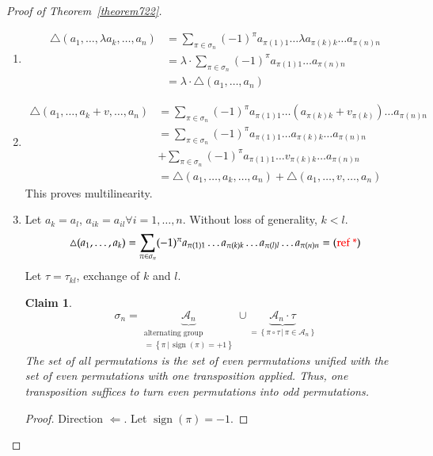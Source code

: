 \documentclass{article}
\numberwithin{lecref}{section}
\newtheorem*{claim}{Claim}
\newcommand{\setdef}[2]{\left\{\left.#1\,\right|\,#2\right\}}
\DeclareMathOperator{\sign}{sign}
\begin{document}
\begin{proof}[Proof of Theorem~\ref{theorem722}]
  \begin{enumerate}
    \item
      \begin{align*}
        \triangle(a_1, \dots, \lambda a_k, \dots, a_n)
          &= \sum_{\pi \in \sigma_n} (-1)^{\pi} a_{\pi(1)1} \dots \lambda a_{\pi(k) k} \dots a_{\pi(n) n} \\
          &= \lambda \cdot \sum_{\pi \in \sigma_n} (-1)^\pi a_{\pi(1) 1} \dots a_{\pi(n) n} \\
          &= \lambda \cdot \triangle(a_1, \dots, a_n)
      \end{align*}
    \item
      \begin{align*}
        \triangle(a_1, \dots, a_k + v, \dots, a_n)
          &= \sum_{\pi \in \sigma_n} (-1)^\pi a_{\pi(1) 1} \dots (a_{\pi(k) k} + v_{\pi(k)}) \dots a_{\pi(n) n} \\
          &= \sum_{\pi \in \sigma_n} (-1)^\pi a_{\pi(1) 1} \dots a_{\pi(k) k} \dots a_{\pi(n) n} \\
          &+ \sum_{\pi \in \sigma_n} (-1)^\pi a_{\pi(1) 1} \dots v_{\pi(k) k} \dots a_{\pi(n) n} \\
          &= \triangle(a_1, \dots, a_k, \dots, a_n) + \triangle(a_1, \dots, v, \dots, a_n)
      \end{align*}
      This proves multilinearity.
    \item
      Let $a_k = a_l$, $a_{ik} = a_{il} \forall i = 1, \dots, n$.
      Without loss of generality, $k < l$.
      \[ \triangle(a_1, \dots, a_k) = \sum_{\pi \in \sigma_n} (-1)^\pi a_{\pi(1) 1} \dots a_{\pi(k) k} \dots a_{\pi(l) l} \dots a_{\pi(n) n} = (\text{\color{red} ref *}) \]
      Let $\tau = \tau_{kl}$, exchange of $k$ and $l$.
      \begin{claim}
        \[ \sigma_n = \underbrace{\mathcal A_n}_{\substack{\text{alternating group} \\ = \setdef{\pi}{\sign(\pi) = +1}}} \cup \underbrace{\mathcal A_{n} \cdot \tau}_{= \setdef{\pi \circ \tau}{\pi \in \mathcal A_n}} \]
        The set of all permutations is the set of even permutations unified with the set of even permutations with one transposition applied. Thus, one transposition suffices to turn even permutations into odd permutations.
      \end{claim}
      \begin{proof}
        Direction $\Leftarrow$.
        Let $\sign(\pi) = -1$.

\end{proof}
\end{enumerate}
\end{proof}
\end{document}
